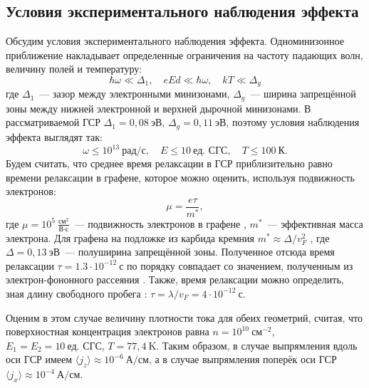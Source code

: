 \subsection{Условия экспериментального наблюдения эффекта}
Обсудим условия экспериментального наблюдения эффекта. Одноминизонное приближение накладывает определенные ограничения на частоту падающих волн, величину полей и температуру:
\begin{equation}
  \hbar\omega \ll \Delta_1,\quad eEd \ll \hbar\omega,\quad kT \ll \Delta_g
\end{equation}
где \( \Delta_1 \)~--- зазор между электронными минизонами, \( \Delta_g \)~--- ширина запрещённой зоны между нижней электронной и верхней дырочной минизонами. В рассматриваемой ГСР \( \Delta_1 = 0,\!08~\text{эВ} \), \( \Delta_g = 0,\!11~\text{эВ} \), поэтому условия наблюдения эффекта выглядят так:
\begin{equation*}
  \omega \le 10^{13}~\text{рад}/\text{с},\quad E \le 10~\text{ед. СГС},\quad T\le100~\text{К}.
\end{equation*}
Будем считать, что среднее время релаксации в ГСР приблизительно равно времени релаксации в графене, которое можно оценить, используя подвижность электронов:
\begin{equation*}
  \mu = \frac{e\tau}{m^*},
\end{equation*}
где \( \mu = 10^5~\frac{\text{см}^2}{\text{В}\cdot\text{с}} \)~--- подвижность электронов в графене \cite{novoselov-geim}, \( m^* \)~--- эффективная масса электрона. Для графена на подложке из карбида кремния \( m^* \approx \Delta / v_F^2 \) , где \( \Delta = 0,\!13~\text{эВ} \)~--- полуширина запрещённой зоны. Полученное отсюда время релаксации \( \tau = 1.3\cdot10^{-12}~\text{с} \) по порядку совпадает со значением, полученным из электрон-фононного рассеяния \cite{graphene-numeric}. Также, время релаксации можно определить, зная длину свободного пробега \cite{novoselov-geim}: \( \tau = \lambda/v_F = 4\cdot10^{-12}~\text{с} \). 

Оценим в этом случае величину плотности тока для обеих геометрий, считая, что поверхностная концентрация электронов равна \( n = 10^{10}~\text{см}^{-2} \), \( E_1 = E_2 = 10~\text{ед. СГС} \), \(T = 77,\!4~\text{K} \). Таким образом, в случае выпрямления вдоль оси ГСР имеем \( \langle j_z \rangle \approx 10^{-6}~\text{А}/\text{см} \), а в случае выпрямления поперёк оси ГСР \( \langle j_x \rangle \approx 10^{-4}~\text{А}/\text{см} \).
